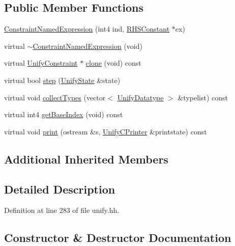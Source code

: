 \subsection*{Public Member Functions}
\begin{DoxyCompactItemize}
\item 
\mbox{\hyperlink{class_constraint_named_expression_a47c220db961ffdd0dacce011f26ab095}{Constraint\+Named\+Expression}} (int4 ind, \mbox{\hyperlink{class_r_h_s_constant}{R\+H\+S\+Constant}} $\ast$ex)
\item 
virtual \mbox{\hyperlink{class_constraint_named_expression_a1b2cba56c9c5c40c16124c85460a8dcf}{$\sim$\+Constraint\+Named\+Expression}} (void)
\item 
virtual \mbox{\hyperlink{class_unify_constraint}{Unify\+Constraint}} $\ast$ \mbox{\hyperlink{class_constraint_named_expression_a5bcd0a8233fb0ed71d8ededd4235d74a}{clone}} (void) const
\item 
virtual bool \mbox{\hyperlink{class_constraint_named_expression_a630676872d5064310afad5d63fa5aea8}{step}} (\mbox{\hyperlink{class_unify_state}{Unify\+State}} \&state)
\item 
virtual void \mbox{\hyperlink{class_constraint_named_expression_a3624723eef17793ebfb9c3af103b09ec}{collect\+Types}} (vector$<$ \mbox{\hyperlink{class_unify_datatype}{Unify\+Datatype}} $>$ \&typelist) const
\item 
virtual int4 \mbox{\hyperlink{class_constraint_named_expression_a76051a70f5e66c4182d97b7e5333763d}{get\+Base\+Index}} (void) const
\item 
virtual void \mbox{\hyperlink{class_constraint_named_expression_ae977efc05b794d8c772c1f4c494a4d3b}{print}} (ostream \&s, \mbox{\hyperlink{class_unify_c_printer}{Unify\+C\+Printer}} \&printstate) const
\end{DoxyCompactItemize}
\subsection*{Additional Inherited Members}


\subsection{Detailed Description}


Definition at line 283 of file unify.\+hh.



\subsection{Constructor \& Destructor Documentation}
\mbox{\label{class_constraint_named_expression_a47c220db961ffdd0dacce011f26ab095}} 
